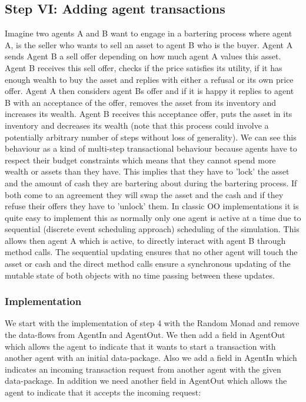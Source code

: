 \subsection{Step VI: Adding agent transactions}
Imagine two agents A and B want to engage in a bartering process where agent A, is the seller who wants to sell an asset to agent B who is the buyer. Agent A sends Agent B a sell offer depending on how much agent A values this asset. Agent B receives this sell offer, checks if the price satisfies its utility, if it has enough wealth to buy the asset and replies with either a refusal or its own price offer. Agent A then considers agent Bs offer and if it is happy it replies to agent B with an acceptance of the offer, removes the asset from its inventory and increases its wealth. Agent B receives this acceptance offer, puts the asset in its inventory and decreases its wealth (note that this process could involve a potentially arbitrary number of steps without loss of generality).
We can see this behaviour as a kind of multi-step transactional behaviour because agents have to respect their budget constraints which means that they cannot spend more wealth or assets than they have. This implies that they have to 'lock' the asset and the amount of cash they are bartering about during the bartering process. If both come to an agreement they will swap the asset and the cash and if they refuse their offers they have to 'unlock' them.
In classic OO implementations it is quite easy to implement this as normally only one agent is active at a time due to sequential (discrete event scheduling approach) scheduling of the simulation. This allows then agent A which is active, to directly interact with agent B through method calls. The sequential updating ensures that no other agent will touch the asset or cash and the direct method calls ensure a synchronous updating of the mutable state of both objects with no time passing between these updates.

\subsubsection{Implementation}
We start with the implementation of step 4 with the Random Monad and remove the data-flows from AgentIn and AgentOut. We then add a field in AgentOut which allows the agent to indicate that it wants to start a transaction with another agent with an initial data-package. Also we add a field in AgentIn which indicates an incoming transaction request from another agent with the given data-package. In addition we need another field in AgentOut which allows the agent to indicate that it accepts the incoming request:

